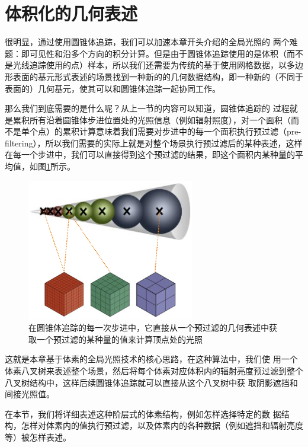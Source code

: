\section{体积化的几何表述}\label{sec:vct-volumetric-presentation}
很明显，通过使用圆锥体追踪，我们可以加速本章开头介绍的全局光照的 两个难题：即可见性和沿多个方向的积分计算。但是由于圆锥体追踪使用的是体积（而不是光线追踪使用的点）样本，所以我们还需要为传统的基于使用网格数据，以多边形表面的基元形式表述的场景找到一种新的的几何数据结构，即一种新的（不同于表面的）几何基元，使其可以和圆锥体追踪一起协同工作。

那么我们到底需要的是什么呢？从上一节的内容可以知道，圆锥体追踪的 过程就是累积所有沿着圆锥体步进位置处的光照信息（例如辐射照度），对一个面积（而不是单个点）的累积计算意味着我们需要对步进中的每一个面积执行预过滤（pre-filtering），所以我们需要的实际上就是对整个场景执行预过滤后的某种表述，这样在每一个步进中，我们可以直接得到这个预过滤的结果，即这个面积内某种量的平均值，如图\ref{f:vct-2-4}所示。

\begin{figure}
\sidecaption
	\includegraphics[width=0.65\textwidth]{figures/vct/vct-2-4}
	\caption{在圆锥体追踪的每一次步进中，它直接从一个预过滤的几何表述中获取一个预过滤的某种量的值来计算顶点处的光照}
	\label{f:vct-2-4}
\end{figure}

这就是本章基于体素的全局光照技术的核心思路，在这种算法中，我们使 用一个体素八叉树来表述整个场景，然后将每个体素对应体积内的辐射亮度预过滤到整个八叉树结构中，这样后续圆锥体追踪就可以直接从这个八叉树中获 取阴影遮挡和间接光照值。

在本节，我们将详细表述这种阶层式的体素结构，例如怎样选择特定的数 据结构，怎样对体素内的值执行预过滤，以及体素内的各种数据（例如遮挡和辐射亮度等）被怎样表述。



